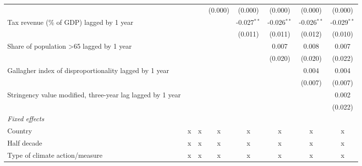 \begin{tabular}{lccccccc}
                                                                                 &         &         & (0.000)       & (0.000)       & (0.000)       & (0.000)       & (0.000)\\   
   Tax revenue (\% of GDP) lagged by 1 year                                      &         &         &               & -0.027$^{**}$ & -0.026$^{**}$ & -0.026$^{**}$ & -0.029$^{**}$\\   
                                                                                 &         &         &               & (0.011)       & (0.011)       & (0.012)       & (0.010)\\   
   Share of population >65 lagged by 1 year                                      &         &         &               &               & 0.007         & 0.008         & 0.007\\   
                                                                                 &         &         &               &               & (0.020)       & (0.020)       & (0.022)\\   
   Gallagher index of disproportionality lagged by 1 year                        &         &         &               &               &               & 0.004         & 0.004\\   
                                                                                 &         &         &               &               &               & (0.007)       & (0.007)\\   
   Stringency value modified, three-year lag lagged by 1 year                    &         &         &               &               &               &               & 0.002\\   
                                                                                 &         &         &               &               &               &               & (0.022)\\   
   \emph{Fixed effects}\\
   Country                                                                       & x       & x       & x             & x             & x             & x             & x\\  
   Half decade                                                                   & x       & x       & x             & x             & x             & x             & x\\  
   Type of climate action/measure                                                & x       & x       & x             & x             & x             & x             & x\\  

\end{tabular}
